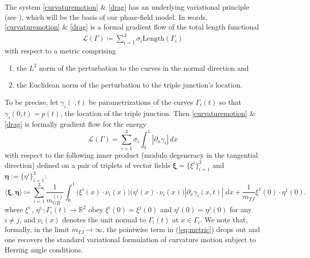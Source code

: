 \documentclass{article}
\theoremstyle{plain}
\theoremstyle{definition}
\theoremstyle{remark}
\newcommand{\bfxi}{\boldsymbol{\xi}}
\newcommand{\bfeta}{\boldsymbol{\eta}}
\begin{document}
The system \eqref{curvaturemotion} \& \eqref{drag} has an underlying variational principle (see \cite{yangesedoglu25}), which will be the basis of our phase-field model. 
In words, \eqref{curvaturemotion} \& \eqref{drag} is a formal gradient flow of the total length functional
\begin{align}
    \mathcal{L}(\Gamma) \coloneqq \sum_{i=1}^3 \sigma_i \text{Length}(\Gamma_i)
\end{align}
with respect to a metric comprising
\begin{enumerate}
    \item the $L^2$ norm of the perturbation to the curves in the normal direction and
    \item the Euclidean norm of the perturbation to the triple junction's location.
\end{enumerate}
To be precise, let $\gamma_i(\cdot,t)$ be parametrizations of the curves $\Gamma_i(t)$ so that $\gamma_i(0,t) = p(t)$, the location of the triple junction.
Then \eqref{curvaturemotion} \& \eqref{drag} is formally gradient flow for the energy
\begin{equation}
\label{eq:parametricenergy}
\mathcal{L}(\Gamma) = \sum_{i=1}^3 \sigma_i \int_0^1 |\partial_x \gamma_i| \, dx
\end{equation}
with respect to the following inner product (modulo degeneracy in the tangential direction) defined on a pair of triplets of vector fields $\bfxi = \{\xi^i\}_{i=1}^3$ and $\bfeta := \{\eta^i\}_{i=1}^3$:
\begin{equation}
\label{eq:metric}
\langle \bfxi , \bfeta  \rangle \coloneqq \sum_{i=1}^3 \frac{1}{m_{GB}^{(i)}}\int_0^1 \big(\xi^i(x) \cdot \nu_i(x)\big)\big( \eta^i(x)\cdot \nu_i(x)\big) |\partial_x \gamma_i(x,t)| \; dx + \frac{1}{m_{TJ}} \xi^1 (0)\cdot \eta^1(0).
\end{equation}
where $\xi^i \, , \, \eta^i \, : \Gamma_i(t) \to \mathbb{R}^2$ obey $\xi^i(0) = \xi^j(0)$ and $\eta^i(0)=\eta^j(0)$ for any $i\not=j$, and $\nu_i(x)$ denotes the unit normal to $\Gamma_i(t)$ at $x\in\Gamma_i$.
We note that, formally, in the limit $m_{TJ} \to \infty$, the pointwise term in (\ref{eq:metric}) drops out and one recovers the standard variational formulation of curvature motion subject to Herring angle conditions.
\end{document}
